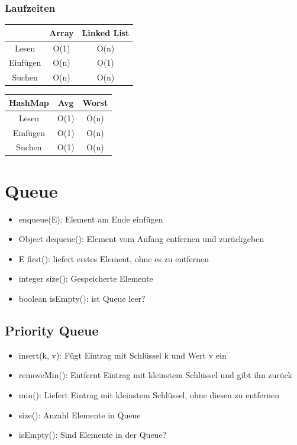 \begin{multicols*}{4}
		\subsubsection{Laufzeiten}
	
			\begin{tabular}{c | c | c}
				& Array & Linked List \\
				\hline
				Lesen & O(1) & O(n) \\
				Einfügen & O(n) & O(1)  \\
				Suchen & O(n) & O(n) \\
			\end{tabular}
		
			\begin{tabular}{c | c | c}
				\textbf{HashMap} & Avg & Worst \\
				\hline
				Lesen & O(1) & O(n) \\
				Einfügen & O(1) & O(n)  \\
				Suchen & O(1) & O(n) \\
			\end{tabular}

\section{Queue}
	\begin{itemize}
		\item enqueue(E): Element am Ende einfügen
		\item Object dequeue(): Element vom Anfang entfernen und
		zurückgeben
		\item E first(): liefert erstes Element, ohne es zu entfernen
		\item integer size(): Gespeicherte Elemente
		\item boolean isEmpty(): ist Queue leer?
	\end{itemize}

	\subsection{Priority Queue}
		\begin{itemize}
			\item insert(k, v): Fügt Eintrag mit Schlüssel k und Wert v ein
			\item removeMin(): Entfernt Eintrag mit kleinstem Schlüssel und gibt ihn zurück
			\item min(): Liefert Eintrag mit kleinstem Schlüssel, ohne diesen zu entfernen
			\item size(): Anzahl Elemente in Queue
			\item isEmpty(): Sind Elemente in der Queue?
		\end{itemize}
		

\end{multicols*}
